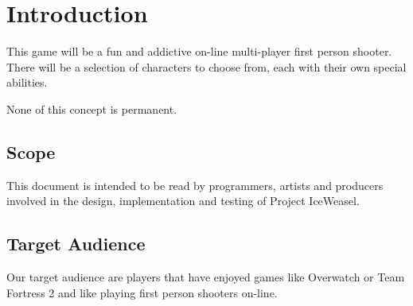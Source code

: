 \section{Introduction}

This game will be a fun and addictive on-line multi-player first person shooter.
There will be  a  selection  of  characters  to choose from, each with their own
special abilities.

None of this concept is permanent.


\subsection{Scope}

This  document  is intended to be read by  programmers,  artists  and  producers
involved  in  the  design,  implementation  and  testing  of  Project IceWeasel.


\subsection{Target Audience}

Our target audience  are  players that have enjoyed games like Overwatch or Team
Fortress 2 and like playing first person shooters on-line.


